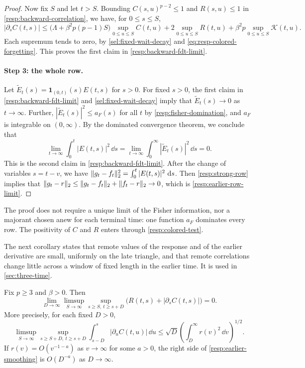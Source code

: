 \begin{proof}
Now fix $S$ and let $t>S$. Bounding $C(s,u)^{p-2}\le1$ and $R(s,u)\le1$ in \eqref{resp:backward-correlation}, we have, for $0\le s\le S$,
\[
 |\partial_sC(t,s)|\le\bigl(\Lambda+\beta^2p(p-1)S\bigr)\sup_{0\le u\le S}C(t,u)
 +2\sup_{0\le u\le S}R(t,u)+\beta^2p\sup_{0\le u\le S}\mathcal K(t,u).
\]
Each supremum tends to zero, by \eqref{sel:fixed-wait-decay} and \eqref{eq:resp-colored-forgetting}. This proves the first claim in \eqref{resp:backward-fdt-limit}.

\paragraph{Step 3: the whole row.}
Let $\widetilde E_t(s)=\mathbf1_{(0,t)}(s)E(t,s)$ for $s>0$. For fixed $s>0$, the first claim in \eqref{resp:backward-fdt-limit} and \eqref{sel:fixed-wait-decay} imply that $\widetilde E_t(s)\to0$ as $t\to\infty$. Further, $|\widetilde E_t(s)|^2\le a_F(s)$ for all $t$ by \eqref{resp:fisher-domination}, and $a_F$ is integrable on $(0,\infty)$. By the dominated convergence theorem, we conclude that
\[
 \lim_{t\to\infty}\int_0^t|E(t,s)|^2\,\dd s=\lim_{t\to\infty}\int_0^\infty|\widetilde E_t(s)|^2\,\dd s=0.
\]
This is the second claim in \eqref{resp:backward-fdt-limit}. After the change of variables $s=t-v$, we have $\lVert g_t-f_t\rVert_2^2=\int_0^t|E(t,s)|^2\,\mathop{}\!\mathrm d s$. Then \cref{resp:strong-row} implies that $\lVert g_t-r\rVert_2\le\lVert g_t-f_t\rVert_2+\lVert f_t-r\rVert_2\to0$, which is \eqref{resp:earlier-row-limit}.
\end{proof}

The proof does not require a unique limit of the Fisher information, nor a majorant chosen anew for each terminal time: one function $a_F$ dominates every row. The positivity of $C$ and $R$ enters through \eqref{resp:colored-test}.

The next corollary states that remote values of the response and of the earlier derivative are small, uniformly on the late triangle, and that remote correlations change little across a window of fixed length in the earlier time. It is used in \cref{sec:three-time}.

\begin{corollary}
\label{resp:remote-earlier}
Fix $p\ge3$ and $\beta>0$. Then
\begin{equation}
 \lim_{D\to\infty}\limsup_{S\to\infty}
 \sup_{s\ge S,\ t\ge s+D}
 \bigl(R(t,s)+|\partial_sC(t,s)|\bigr)=0.
 \label{resp:remote-earlier-limit}
\end{equation}
More precisely, for each fixed $D>0$,
\begin{equation}
 \limsup_{S\to\infty}
 \sup_{s\ge S+D,\ t\ge s+D}
 \int_{s-D}^s|\partial_uC(t,u)|\,\dd u
 \le\sqrt D\left(\int_D^\infty r(v)^2\,\dd v\right)^{1/2}.
 \label{resp:earlier-smoothing}
\end{equation}
If $r(v)=O(v^{-1-a})$ as $v\to\infty$ for some $a>0$, the right side of \eqref{resp:earlier-smoothing} is $O(D^{-a})$ as $D\to\infty$.
\end{corollary}


